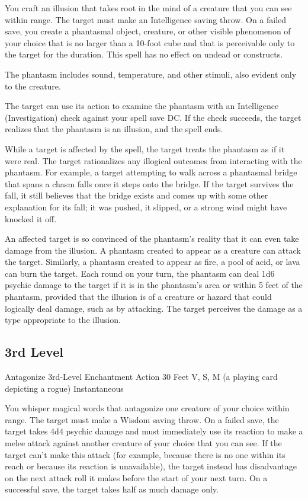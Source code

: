 \documentclass[letterpaper,openany,oneside,twocolumn]{book}
\begin{document}
You craft an illusion that takes root in the mind of a creature that you can see within range. The target must make an Intelligence saving throw. On a failed save, you create a phantasmal object, creature, or other visible phenomenon of your choice that is no larger than a 10-foot cube and that is perceivable only to the target for the duration. This spell has no effect on undead or constructs.

The phantasm includes sound, temperature, and other stimuli, also evident only to the creature.

The target can use its action to examine the phantasm with an Intelligence (Investigation) check against your spell save DC. If the check succeeds, the target realizes that the phantasm is an illusion, and the spell ends.

While a target is affected by the spell, the target treats the phantasm as if it were real. The target rationalizes any illogical outcomes from interacting with the phantasm. For example, a target attempting to walk across a phantasmal bridge that spans a chasm falls once it steps onto the bridge. If the target survives the fall, it still believes that the bridge exists and comes up with some other explanation for its fall; it was pushed, it slipped, or a strong wind might have knocked it off.

An affected target is so convinced of the phantasm's reality that it can even take damage from the illusion. A phantasm created to appear as a creature can attack the target. Similarly, a phantasm created to appear as fire, a pool of acid, or lava can burn the target. Each round on your turn, the phantasm can deal 1d6 psychic damage to the target if it is in the phantasm's area or within 5 feet of the phantasm, provided that the illusion is of a creature or hazard that could logically deal damage, such as by attacking. The target perceives the damage as a type appropriate to the illusion.

\subsection*{3rd Level}

\DndSpellHeader
  {Antagonize}
  {3rd-Level Enchantment}
  {Action}
  {30 Feet}
  {V, S, M (a playing card depicting a rogue)}
  {Instantaneous}

You whisper magical words that antagonize one creature of your choice within range. The target must make a Wisdom saving throw. On a failed save, the target takes 4d4 psychic damage and must immediately use its reaction to make a melee attack against another creature of your choice that you can see. If the target can't make this attack (for example, because there is no one within its reach or because its reaction is unavailable), the target instead has disadvantage on the next attack roll it makes before the start of your next turn. On a successful save, the target takes half as much damage only.
\end{document}
